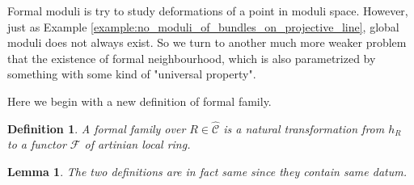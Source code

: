 \documentclass{ctexart}
\newtheorem{definition}{Definition}[section]
\newtheorem{lemma}{Lemma}[section]
\begin{document}
Formal moduli is try to study deformations of a point in moduli space.
However, just as Example \ref{example:no_moduli_of_bundles_on_projective_line}, global moduli does not always exist.
So we turn to another much more weaker problem that the existence of formal neighbourhood,
which is also parametrized by something with some kind of "universal property".
\par
Here we begin with a new definition of formal family.
\begin{definition}
    A formal family over $R\in \widehat{\mathcal{C}}$ is a natural transformation from $h_{R}$ to a functor $\mathcal{F}$ of artinian local ring.
\end{definition}
\begin{lemma}
    The two definitions are in fact same since they contain same datum.
    \label{Lemma 4.1}
\end{lemma}
\end{document}
